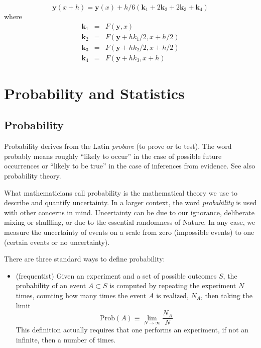 \documentclass[justified, sixbynine]{tufte-book}
\theoremstyle{plain}%
\newtheorem * {corollary}{Corollary}
\theoremstyle{definition}
\theoremstyle{remark}
\newtheorem * {remark}{Remark}
\newtheorem * {note}{Note}
\begin{document}
\begin{fullwidth}
\begin{equation}
\mathbf{y}(x+h) = \mathbf{y}(x) + h/6 (\mathbf{k}_1+2\mathbf{k}_2+2\mathbf{k}_3+\mathbf{k}_4)\label{rungekatta}
\end{equation}
where
\begin{eqnarray}
\mathbf{k}_1 &=& F(\mathbf{y}, x) \\
\mathbf{k}_2 &=& F(\mathbf{y}+h k_1/2, x+h/2) \\
\mathbf{k}_3 &=& F(\mathbf{y}+h k_2/2, x+h/2) \\
\mathbf{k}_4 &=& F(\mathbf{y}+h k_3, x+h)
\end{eqnarray}

\chapter{Probability and Statistics}

\goodbreak\section{Probability}


Probability derives from the Latin {\it probare} (to prove or to test). The word
probably means roughly ``likely to occur'' in the case of possible future
occurrences or ``likely to be true'' in the case of inferences from
evidence. See also probability theory.

What mathematicians call probability is the mathematical theory we use to
describe and quantify uncertainty. In a larger context, the word {\it probability}
is used with other concerns in mind. Uncertainty can be due to our
ignorance, deliberate mixing or shuffling, or due to the essential
randomness of Nature. In any case, we measure the uncertainty of events on a
scale from zero (impossible events) to one (certain events or no
uncertainty).

There are three standard ways to define probability:

\begin{itemize}
\item  (frequentist) Given an experiment and a set of possible outcomes $S$, 
the probability of an event $A\subset S$ is computed by repeating the
experiment $N$ times, counting how many times the event $A$ is realized, $N_A
$, then taking the limit
\begin{equation}
\textrm{Prob}(A)\equiv \lim_{N\rightarrow \infty }\frac{N_A}N
\end{equation}
This definition actually requires that one performs an experiment, 
if not an infinite, then a number of times.


\end{itemize}
\end{fullwidth}
\end{document}
